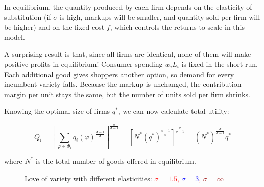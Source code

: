 \documentclass[11pt,letterpaper]{article}
\begin{document}
In equilibrium, the quantity produced by each firm depends on the elasticity of substitution (if $\sigma$ is high, markups will be smaller, and quantity sold per firm will be higher) and on the fixed cost $\bar{f}$, which controls the returns to scale in this model. 

A surprising result is that, since all firms are identical, none of them will make positive profits in equilibrium! Consumer spending $w_iL_i$ is fixed in the short run. Each additional good gives shoppers another option, so demand for every incumbent variety falls. Because the markup is unchanged, the contribution margin per unit stays the same, but the number of units sold per firm shrinks.

Knowing the optimal size of firms $q^*$, we can now calculate total utility:

\begin{equation*}
    Q_i = \left[ \sum_{\varphi \in \Phi_i } q_i(
\varphi)^{\tfrac{\sigma-1}{\sigma}} \right]^{\tfrac{\sigma}{\sigma-1} }  = \left[ N^* ( q^*
)^{\tfrac{\sigma-1}{\sigma}} \right]^{\tfrac{\sigma}{\sigma-1} } = (N^*)^{\tfrac{\sigma}{\sigma-1} } q^* 
\end{equation*}

\noindent where $N^*$ is the total number of goods offered in equilibrium.


    \begin{figure}[htp]
        \centering
            \caption{Love of variety with different elasticities: \textcolor{red}{$\sigma=1.5$, \textcolor{blue}{$\sigma=3$}, \textcolor{brown}{$\sigma=\infty$}}}
        \label{fig: ces-love}
    \end{figure}
\end{document}
